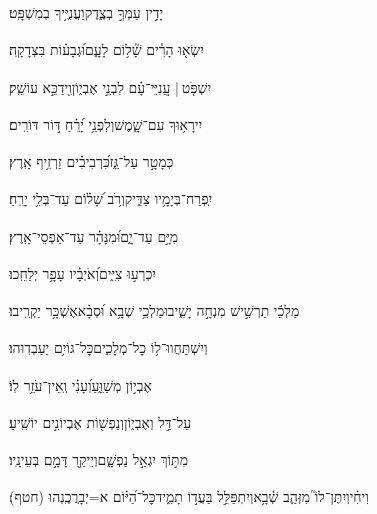 \documentclass[12pt]{article}
\newcommand{\loc}[1]{\textsuperscript{\locf{#1}}}
\begin{document}
{\loc{ ב}~}‏יָדִ֣ין עַמְּךָ֣ בְצֶ֑דֶק{\hfill}וַעֲנִיֶּ֥יךָ בְמִשְׁפָּֽט׃\par

{\loc{ ג}~}‏יִשְׂא֤וּ הָרִ֓ים שָׁ֘ל֥וֹם לָעָ֑ם{\hfill}וּ֝גְבָע֗וֹת בִּצְדָקָֽה׃\par

{\loc{ ד}~}‏יִשְׁפֹּ֤ט | {\hfill}עֲֽנִיֵּי־עָ֗ם\newline\hspace*{.5em} לִבְנֵ֣י אֶבְי֑וֹן{\hfill}וִ֖ידַכֵּ֣א עוֹשֵֽׁק׃\par

{\loc{ ה}~}‏יִירָא֥וּךָ עִם־שָׁ֑מֶשׁ{\hfill}וְלִפְנֵ֥י יָ֝רֵ֗חַ דּ֣וֹר דּוֹרִֽים׃\par

{\loc{ ו}~}‏ כְּמָטָ֣ר עַל־גֵּ֑ז{\hfill}כִּ֝רְבִיבִ֗ים זַרְזִ֥יף אָֽרֶץ׃\par

{\loc{ ז}~}‏יִֽפְרַח־בְּיָמָ֥יו צַדִּ֑יק{\hfill}וְרֹ֥ב שָׁ֝ל֗וֹם עַד־בְּלִ֥י יָרֵֽחַ׃\par

{\loc{ ח}~}‏ מִיָּ֣ם עַד־יָ֑ם{\hfill}וּ֝מִנָּהָ֗ר עַד־אַפְסֵי־אָֽרֶץ׃\par

{\loc{ ט}~}‏ יִכְרְע֣וּ צִיִּ֑ים{\hfill}וְ֝אֹיְבָ֗יו עָפָ֥ר יְלַחֵֽכוּ׃\par

{\loc{ י}~}‏מַלְכֵ֬י תַרְשִׁ֣ישׁ {\hfill}מִנְחָ֣ה יָשִׁ֑יבוּ\newline\hspace*{.5em}מַלְכֵ֥י שְׁבָ֥א וּ֝סְבָ֗א{\hfill}אֶשְׁכָּ֥ר יַקְרִֽיבוּ׃\par

{\loc{ יא}~}‏וְיִשְׁתַּחֲווּ־ל֥וֹ כׇל־מְלָכִ֑ים{\hfill}כׇּל־גּוֹיִ֥ם יַעַבְדֽוּהוּ׃\par

{\loc{ יב}~}‏ אֶבְי֣וֹן מְשַׁוֵּ֑עַ{\hfill}וְ֝עָנִ֗י וְֽאֵין־עֹזֵ֥ר לֽוֹ׃\par

{\loc{ יג}~}‏ עַל־דַּ֣ל וְאֶבְי֑וֹן{\hfill}וְנַפְשׁ֖וֹת אֶבְיוֹנִ֣ים יוֹשִֽׁיעַ׃\par

{\loc{ יד}~}‏מִתּ֣וֹךְ  יִגְאַ֣ל נַפְשָׁ֑ם{\hfill}וְיֵיקַ֖ר דָּמָ֣ם בְּעֵינָֽיו׃\par

{\loc{ טו}~}‏וִיחִ֗י{\hfill}וְיִתֶּן־לוֹ֮ מִזְּהַ֢ב שְׁ֫בָ֥א\newline\hspace*{.5em}וְיִתְפַּלֵּ֣ל בַּעֲד֣וֹ תָמִ֑יד{\hfill}כׇּל־הַ֝יּ֗וֹם א=יְבָרֲכֶֽנְהוּ (חטף)׃\par
\end{document}
